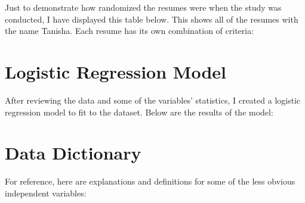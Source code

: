 \documentclass{paper}
\begin{document}
Just to demonstrate how randomized the resumes were when the study was conducted, I have displayed this table below. This shows all of the resumes with the name Tanisha. Each resume has its own combination of criteria:





\section{Logistic Regression Model}


After reviewing the data and some of the variables' statistics, I created a logistic regression model to fit to the dataset. Below are the results of the model:








\section{Data Dictionary}


For reference, here are explanations and definitions for some of the less obvious independent variables:







\end{document}
